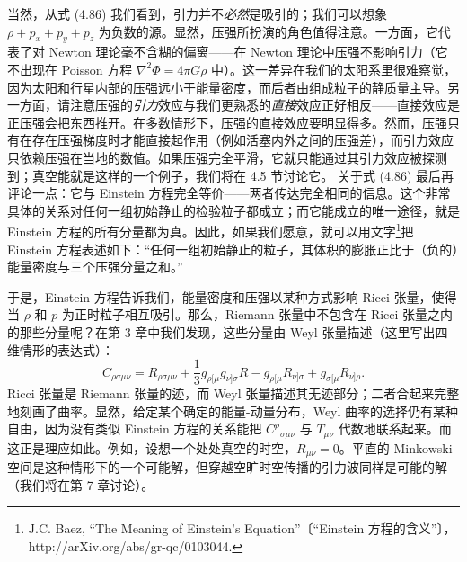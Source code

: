 当然，从式 (4.86) 我们看到，引力并不\emph{必然}是吸引的；我们可以想象 $\rho+p_x+p_y+p_z$ 为负数的源。显然，压强所扮演的角色值得注意。一方面，它代表了对 Newton 理论毫不含糊的偏离——在 Newton 理论中压强不影响引力（它不出现在 Poisson 方程 $\nabla^2\Phi=4\pi G\rho$ 中）。这一差异在我们的太阳系里很难察觉，因为太阳和行星内部的压强远小于能量密度，而后者由组成粒子的静质量主导。另一方面，请注意压强的\emph{引力}效应与我们更熟悉的\emph{直接}效应正好相反——直接效应是正压强会把东西推开。在多数情形下，压强的直接效应要明显得多。然而，压强只有在存在压强梯度时才能直接起作用（例如活塞内外之间的压强差），而引力效应只依赖压强在当地的数值。如果压强完全平滑，它就只能通过其引力效应被探测到；真空能就是这样的一个例子，我们将在 4.5 节讨论它。
关于式 (4.86) 最后再评论一点：它与 Einstein 方程完全等价——两者传达完全相同的信息。这个非常具体的关系对任何一组初始静止的检验粒子都成立；而它能成立的唯一途径，就是 Einstein 方程的所有分量都为真。因此，如果我们愿意，就可以用文字\footnote{J.C. Baez, “The Meaning of Einstein's Equation”〔“Einstein 方程的含义”〕， http://arXiv.org/abs/gr-qc/0103044.}把 Einstein 方程表述如下：“任何一组初始静止的粒子，其体积的膨胀正比于（负的）能量密度与三个压强分量之和。”

于是，Einstein 方程告诉我们，能量密度和压强以某种方式影响 Ricci 张量，使得当 $\rho$ 和 $p$ 为正时粒子相互吸引。那么，Riemann 张量中不包含在 Ricci 张量之内的那些分量呢？在第 3 章中我们发现，这些分量由 Weyl 张量描述（这里写出四维情形的表达式）：
\begin{equation*}
C_{\rho\sigma\mu\nu} = R_{\rho\sigma\mu\nu} + \frac{1}{3}g_{\rho[\mu}g_{\nu]\sigma}R - g_{\rho[\mu}R_{\nu]\sigma} + g_{\sigma[\mu}R_{\nu]\rho}.
\tag{4.87}
\end{equation*}
Ricci 张量是 Riemann 张量的迹，而 Weyl 张量描述其无迹部分；二者合起来完整地刻画了曲率。显然，给定某个确定的能量-动量分布，Weyl 曲率的选择仍有某种自由，因为没有类似 Einstein 方程的关系能把 $C^\rho{}_{\sigma\mu\nu}$ 与 $T_{\mu\nu}$ 代数地联系起来。而这正是理应如此。例如，设想一个处处真空的时空，$R_{\mu\nu}=0$。平直的 Minkowski 空间是这种情形下的一个可能解，但穿越空旷时空传播的引力波同样是可能的解（我们将在第 7 章讨论）。

